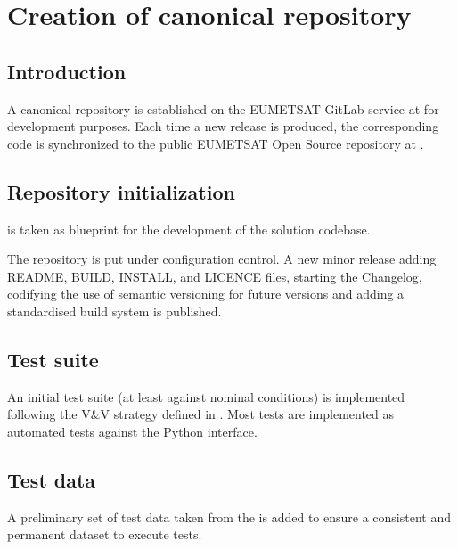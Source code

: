 \documentclass[a4paper,10pt,english]{sphinxmanual}
\begin{document}
\chapter{Creation of canonical repository}
\label{\detokenize{canonical_repository:creation-of-canonical-repository}}\label{\detokenize{canonical_repository:id1}}\label{\detokenize{canonical_repository::doc}}

\section{Introduction}
\label{\detokenize{canonical_repository:introduction}}
\sphinxAtStartPar
A canonical repository is established on the EUMETSAT GitLab service at 
for development purposes. Each time a new release is produced, the corresponding code is synchronized to the public
EUMETSAT Open Source repository at .


\section{Repository initialization}
\label{\detokenize{canonical_repository:repository-initialization}}\label{\detokenize{canonical_repository:id2}}
\sphinxAtStartPar
{\hyperref[\detokenize{introduction:fcidecomp-latest}]{}} is taken as blueprint for the development of the solution codebase.

\sphinxAtStartPar
The repository is put under configuration control. A new minor release adding README, BUILD, INSTALL, and LICENCE
files, starting the Changelog, codifying the use of semantic versioning for future versions and adding a standardised
build system is published.


\section{Test suite}
\label{\detokenize{canonical_repository:test-suite}}
\sphinxAtStartPar
An initial test suite (at least against nominal conditions) is implemented following the V\&V strategy defined in
. Most tests are implemented as automated tests against the Python interface.


\section{Test data}
\label{\detokenize{canonical_repository:test-data}}
\sphinxAtStartPar
A preliminary set of test data taken from the {\hyperref[\detokenize{introduction:fcidecomp-test-data}]{}} is added to ensure a
consistent and permanent dataset to execute tests.
\end{document}
